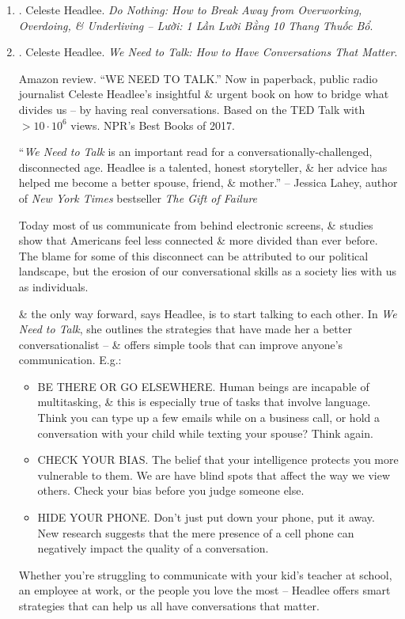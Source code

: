 \documentclass{article}
\begin{document}
\begin{enumerate}
	\item \cite{Headlee_do_nothing_VN}. {\sc Celeste Headlee}. {\it Do Nothing: How to Break Away from Overworking, Overdoing, \& Underliving -- Lười: 1 Lần Lười Bằng 10 Thang Thuốc Bổ}.
	
	\item \cite{Headlee_talk}. {\sc Celeste Headlee}. {\it We Need to Talk: How to Have Conversations That Matter}. {}
	
	{\sf Amazon review.} ``WE NEED TO TALK.'' Now in paperback, public radio journalist {\sc Celeste Headlee}'s insightful \& urgent book on how to bridge what divides us -- by having real conversations. Based on the TED Talk with $> 10\cdot10^6$ views. NPR's Best Books of 2017.
	
	``{\it We Need to Talk} is an important read for a conversationally-challenged, disconnected age. {\sc Headlee} is a talented, honest storyteller, \& her advice has helped me become a better spouse, friend, \& mother.'' -- {\sc Jessica Lahey}, author of {\it New York Times} bestseller {\it The Gift of Failure}
	
	Today most of us communicate from behind electronic screens, \& studies show that Americans feel less connected \& more divided than ever before. The blame for some of this disconnect can be attributed to our political landscape, but the erosion of our conversational skills as a society lies with us as individuals.
	
	\& the only way forward, says {\sc Headlee}, is to start talking to each other. In {\it We Need to Talk}, she outlines the strategies that have made her a better conversationalist -- \& offers simple tools that can improve anyone's communication. E.g.:
	\begin{itemize}
		\item BE THERE OR GO ELSEWHERE. Human beings are incapable of multitasking, \& this is especially true of tasks that involve language. Think you can type up a few emails while on a business call, or hold a conversation with your child while texting your spouse? Think again.
		\item CHECK YOUR BIAS. The belief that your intelligence protects you more vulnerable to them. We are have blind spots that affect the way we view others. Check your bias before you judge someone else.
		\item HIDE YOUR PHONE. Don't just put down your phone, put it away. New research suggests that the mere presence of a cell phone can negatively impact the quality of a conversation.
	\end{itemize}
	Whether you're struggling to communicate with your kid's teacher at school, an employee at work, or the people you love the most -- {\sc Headlee} offers smart strategies that can help us all have conversations that matter.
	

\end{enumerate}
\end{document}
